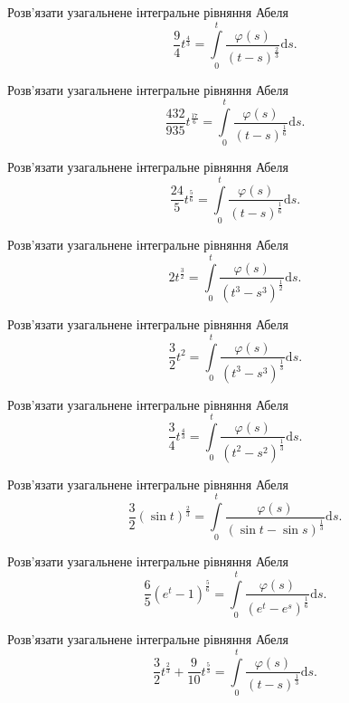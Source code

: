 \documentclass[12pt]{extarticle}
\begin{document}
\begin{Exercise}
Розв’язати узагальнене інтегральне рівняння Абеля \[\dfrac{9}{4} t^{\frac{4}{3}} = \int\limits_{0}^{t} \dfrac{\varphi(s)}{(t-s)^{\frac{2}{3}}} \mathrm{d}s.\]
\end{Exercise}

\begin{Exercise}
Розв’язати узагальнене інтегральне рівняння Абеля \[\dfrac{432}{935} t^{\frac{17}{6}} = \int\limits_{0}^{t} \dfrac{\varphi(s)}{(t-s)^{\frac{1}{6}}} \mathrm{d}s.\]
\end{Exercise}

\begin{Exercise}
Розв’язати узагальнене інтегральне рівняння Абеля \[\dfrac{24}{5} t^{\frac{5}{6}} = \int\limits_{0}^{t} \dfrac{\varphi(s)}{(t-s)^{\frac{1}{6}}} \mathrm{d}s.\]
\end{Exercise}

\begin{Exercise}
Розв’язати узагальнене інтегральне рівняння Абеля \[2 t^{\frac{3}{2}} = \int\limits_{0}^{t} \dfrac{\varphi(s)}{(t^3-s^3)^{\frac{1}{2}}} \mathrm{d}s.\]
\end{Exercise}

\begin{Exercise}
Розв’язати узагальнене інтегральне рівняння Абеля \[\dfrac{3}{2} t^2 = \int\limits_{0}^{t} \dfrac{\varphi(s)}{(t^3-s^3)^{\frac{1}{3}}} \mathrm{d}s.\]
\end{Exercise}

\begin{Exercise}
Розв’язати узагальнене інтегральне рівняння Абеля \[\dfrac{3}{4} t^{\frac{4}{3}} = \int\limits_{0}^{t} \dfrac{\varphi(s)}{(t^2-s^2)^{\frac{1}{3}}} \mathrm{d}s.\]
\end{Exercise}

\begin{Exercise}
Розв’язати узагальнене інтегральне рівняння Абеля \[\dfrac{3}{2} (\sin t)^{\frac{2}{3}} = \int\limits_{0}^{t} \dfrac{\varphi(s)}{(\sin t- \sin s)^{\frac{1}{3}}} \mathrm{d}s.\]
\end{Exercise}

\begin{Exercise}
Розв’язати узагальнене інтегральне рівняння Абеля \[\dfrac{6}{5} \left(e^t - 1\right)^{\frac{5}{6}} = \int\limits_{0}^{t} \dfrac{\varphi(s)}{\left(e^t-e^s\right)^{\frac{1}{6}}} \mathrm{d}s.\]
\end{Exercise}

\begin{Exercise}
Розв’язати узагальнене інтегральне рівняння Абеля \[\dfrac{3}{2} t^{\frac{2}{3}} + \dfrac{9}{10} t^{\frac{5}{3}} = \int\limits_{0}^{t} \dfrac{\varphi(s)}{(t-s)^{\frac{1}{3}}} \mathrm{d}s.\]
\end{Exercise}
\end{document}
